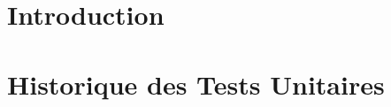 \documentclass[asi]{picInsa}
\title{\JTU{}}
\author{\Michel} %
\begin{document}
\couverture{}

 \informationsGenerales{}


\tableofcontents

\setcounter{chapter}{0}

\chapter*{Introduction}
\label{introduction}


\chapter{Historique des Tests Unitaires}
\label{historiquesDesTestsUnitaires}




\pageQuatriemeCouverture
\end{document}

